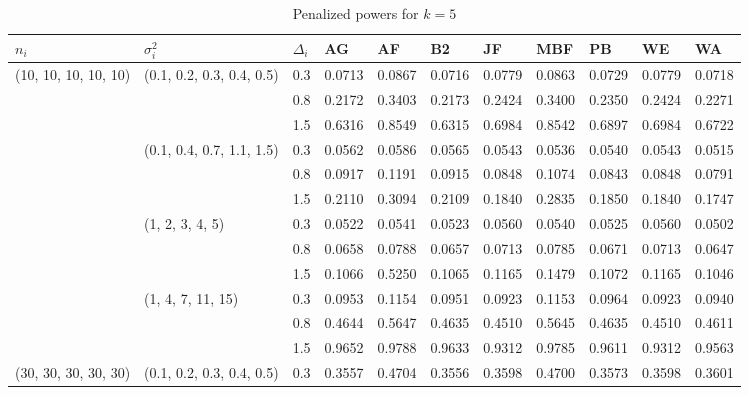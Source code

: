 \begin{table}[h]\footnotesize
\caption{Penalized powers for $k=5$}
\begin{tabular}{lllllllllll}\toprule
$n_i$             & $\sigma_i^2$                     & $\Delta_i$ & AG     & AF     & B2     & JF     & MBF    & PB     & WE     & WA     \\\toprule
(10, 10, 10, 10, 10) 	& (0.1, 0.2, 0.3, 0.4, 0.5) 	& 0.3   	& 0.0713 	& 0.0867 	& 0.0716 	& 0.0779 	& 0.0863 	& 0.0729 	& 0.0779 	& 0.0718 \\
                     		&                           		& 0.8   	& 0.2172 	& 0.3403 	& 0.2173 	& 0.2424 	& 0.3400 	& 0.2350 	& 0.2424 	& 0.2271 \\
                     		&                           		& 1.5   	& 0.6316 	& 0.8549 	& 0.6315 	& 0.6984 	& 0.8542 	& 0.6897 	& 0.6984 	& 0.6722 \\
                     		& (0.1, 0.4, 0.7, 1.1, 1.5) 	& 0.3   	& 0.0562 	& 0.0586 	& 0.0565 	& 0.0543 	& 0.0536 	& 0.0540 	& 0.0543 	& 0.0515 \\
                     		&                           		& 0.8   	& 0.0917 	& 0.1191 	& 0.0915 	& 0.0848 	& 0.1074 	& 0.0843 	& 0.0848 	& 0.0791 \\
                     		&                           		& 1.5   	& 0.2110 	& 0.3094 	& 0.2109 	& 0.1840 	& 0.2835 	& 0.1850 	& 0.1840 	& 0.1747 \\
                     		& (1, 2, 3, 4, 5)           	& 0.3   	& 0.0522 	& 0.0541 	& 0.0523 	& 0.0560 	& 0.0540 	& 0.0525 	& 0.0560 	& 0.0502 \\
                     		&                           		& 0.8   	& 0.0658 	& 0.0788 	& 0.0657 	& 0.0713 	& 0.0785 	& 0.0671 	& 0.0713 	& 0.0647 \\
                     		&                           		& 1.5   	& 0.1066 	& 0.5250 	& 0.1065 	& 0.1165 	& 0.1479 	& 0.1072 	& 0.1165 	& 0.1046 \\
                     		& (1, 4, 7, 11, 15)         	& 0.3   	& 0.0953 	& 0.1154 	& 0.0951 	& 0.0923 	& 0.1153 	& 0.0964 	& 0.0923 	& 0.0940 \\
                     		&                           		& 0.8   	& 0.4644 	& 0.5647 	& 0.4635 	& 0.4510 	& 0.5645 	& 0.4635 	& 0.4510 	& 0.4611 \\
                     		&                           		& 1.5   	& 0.9652 	& 0.9788 	& 0.9633 	& 0.9312 	& 0.9785 	& 0.9611 	& 0.9312 	& 0.9563 \\\hline
(30, 30, 30, 30, 30) 	& (0.1, 0.2, 0.3, 0.4, 0.5) 	& 0.3   	& 0.3557 	& 0.4704 	& 0.3556 	& 0.3598 	& 0.4700 	& 0.3573 	& 0.3598 	& 0.3601 \\

\end{tabular}
\end{table}
